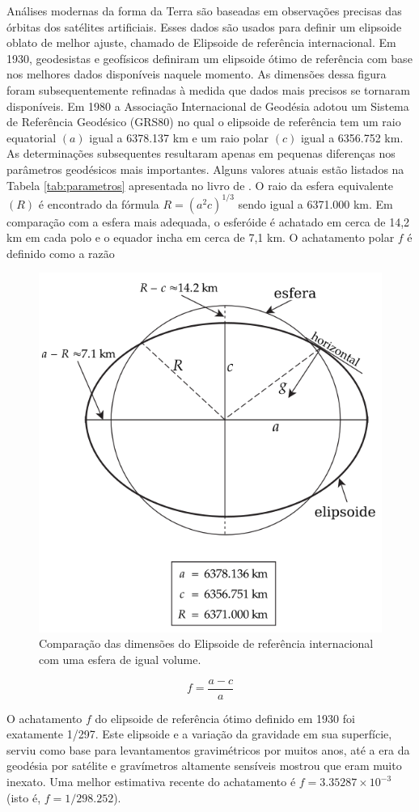 \documentclass[]{book}
\theoremstyle{definition}
\theoremstyle{definition}
\theoremstyle{definition}
\theoremstyle{remark}
\begin{document}
Análises modernas da forma da Terra são baseadas em observações precisas das órbitas dos satélites artificiais. Esses dados são usados para definir um elipsoide oblato de melhor ajuste, chamado de Elipsoide de referência internacional. Em 1930, geodesistas e geofísicos definiram um elipsoide ótimo de referência com base nos melhores dados disponíveis naquele momento. As dimensões dessa figura foram subsequentemente refinadas à medida que dados mais precisos se tornaram disponíveis. Em 1980 a Associação Internacional de Geodésia adotou um Sistema de Referência Geodésico (GRS80) no qual o elipsoide de referência tem um raio equatorial \((a)\) igual a 6378.137 km e um raio polar \((c)\) igual a 6356.752 km. As determinações subsequentes resultaram apenas em pequenas diferenças nos parâmetros geodésicos mais importantes. Alguns valores atuais estão listados na Tabela \ref{tab:parametros} apresentada no livro de \citet{lowrie_2007}. O raio da esfera equivalente \((R)\) é encontrado da fórmula \(R=(a^2 c)^{1/3}\) sendo igual a 6371.000 km. Em comparação com a esfera mais adequada, o esferóide é achatado em cerca de 14,2 km em cada polo e o equador incha em cerca de 7,1 km. O achatamento polar \(f\) é definido como a razão

\begin{figure}

{\centering \includegraphics[width=0.4\linewidth]{fig/Fig_02.20} 

}

\caption{Comparação das dimensões do Elipsoide de referência internacional com uma esfera de igual volume.}\label{fig:elipsoide}
\end{figure}

\begin{equation}
f= \frac{a-c}{a} \label{eq:0217}
\end{equation}

O achatamento \(f\) do elipsoide de referência ótimo definido em 1930 foi exatamente 1/297. Este elipsoide e a variação da gravidade em sua superfície, serviu como base para levantamentos gravimétricos por muitos anos, até a era da geodésia por satélite e gravímetros altamente sensíveis mostrou que eram muito inexato. Uma melhor estimativa recente do achatamento é \(f=3.35287\times 10^{-3}\) (isto é, \(f=1/298.252\)).
\end{document}

